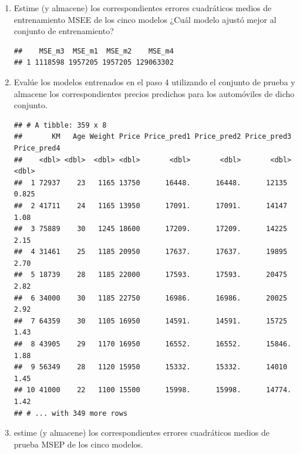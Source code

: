 \documentclass[11pt,letterpaper]{article}\usepackage[]{graphicx}\usepackage[]{color}
\makeatletter
\newenvironment{kframe}{%
 \def\at@end@of@kframe{}%
 \ifinner\ifhmode%
  \def\at@end@of@kframe{\end{minipage}}%
  \begin{minipage}{\columnwidth}%
 \fi\fi%
 \def\FrameCommand##1{\hskip\@totalleftmargin \hskip-\fboxsep
 \colorbox{shadecolor}{##1}\hskip-\fboxsep
     \hskip-\linewidth \hskip-\@totalleftmargin \hskip\columnwidth}%
 \MakeFramed {\advance\hsize-\width
   \@totalleftmargin\z@ \linewidth\hsize
   \@setminipage}}%
 {\par\unskip\endMakeFramed%
 \at@end@of@kframe}
\newenvironment{knitrout}{}{} %
\makeatother
\begin{document}
\begin{enumerate}
    \item Estime (y almacene) los correspondientes errores cuadráticos medios de entrenamiento MSEE de los cinco modelos ¿Cuál modelo ajustó mejor al conjunto de entrenamiento?
    
\begin{knitrout}
\color{fgcolor}\begin{kframe}
\begin{verbatim}
##    MSE_m3  MSE_m1  MSE_m2    MSE_m4
## 1 1118598 1957205 1957205 129063302
\end{verbatim}
\end{kframe}
\end{knitrout}

    \item Evalúe los modelos entrenados en el paso 4 utilizando el conjunto de prueba y almacene los correspondientes precios predichos para los automóviles de dicho conjunto.

\begin{knitrout}
\color{fgcolor}\begin{kframe}
\begin{verbatim}
## # A tibble: 359 x 8
##       KM   Age Weight Price Price_pred1 Price_pred2 Price_pred3 Price_pred4
##    <dbl> <dbl>  <dbl> <dbl>       <dbl>       <dbl>       <dbl>       <dbl>
##  1 72937    23   1165 13750      16448.      16448.      12135        0.825
##  2 41711    24   1165 13950      17091.      17091.      14147        1.08 
##  3 75889    30   1245 18600      17209.      17209.      14225        2.15 
##  4 31461    25   1185 20950      17637.      17637.      19895        2.70 
##  5 18739    28   1185 22000      17593.      17593.      20475        2.82 
##  6 34000    30   1185 22750      16986.      16986.      20025        2.92 
##  7 64359    30   1105 16950      14591.      14591.      15725        1.43 
##  8 43905    29   1170 16950      16552.      16552.      15846.       1.88 
##  9 56349    28   1120 15950      15332.      15332.      14010        1.45 
## 10 41000    22   1100 15500      15998.      15998.      14774.       1.42 
## # ... with 349 more rows
\end{verbatim}
\end{kframe}
\end{knitrout}
\item estime (y almacene) los correspondientes errores cuadráticos medios de prueba MSEP de los cinco modelos.


\end{enumerate}
\end{document}
